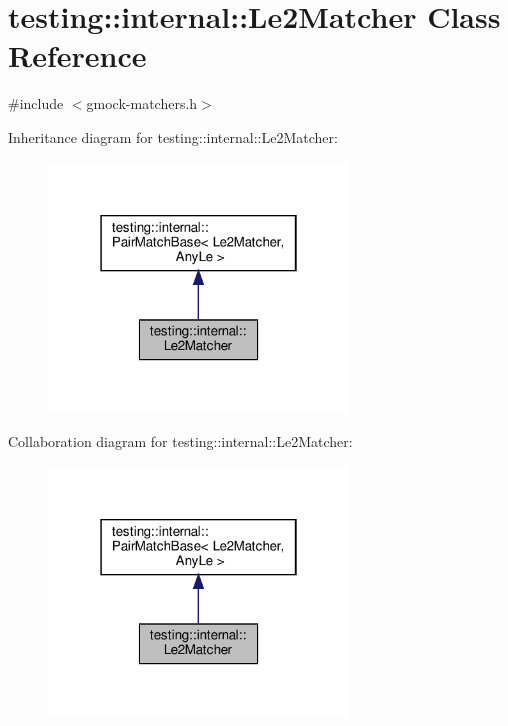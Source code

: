 \hypertarget{classtesting_1_1internal_1_1_le2_matcher}{}\section{testing\+:\+:internal\+:\+:Le2\+Matcher Class Reference}
\label{classtesting_1_1internal_1_1_le2_matcher}


{\ttfamily \#include $<$gmock-\/matchers.\+h$>$}



Inheritance diagram for testing\+:\+:internal\+:\+:Le2\+Matcher\+:
\nopagebreak
\begin{figure}[H]
\begin{center}
\leavevmode
\includegraphics[width=226pt]{classtesting_1_1internal_1_1_le2_matcher__inherit__graph}
\end{center}
\end{figure}


Collaboration diagram for testing\+:\+:internal\+:\+:Le2\+Matcher\+:
\nopagebreak
\begin{figure}[H]
\begin{center}
\leavevmode
\includegraphics[width=226pt]{classtesting_1_1internal_1_1_le2_matcher__coll__graph}
\end{center}
\end{figure}
